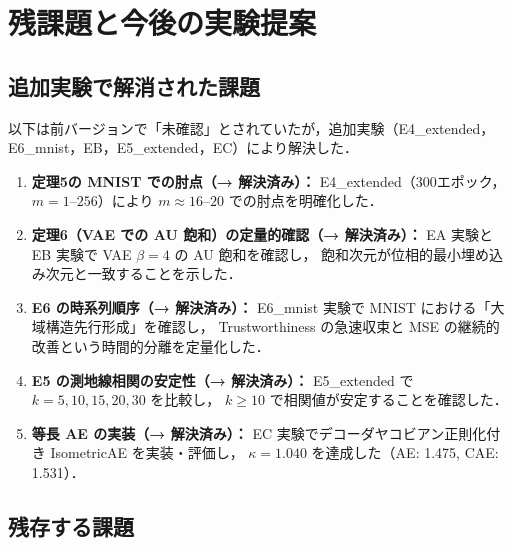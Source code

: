\documentclass[12pt,a4paper]{ltjsarticle}  %
\begin{document}
\section{残課題と今後の実験提案}

\subsection{追加実験で解消された課題}

以下は前バージョンで「未確認」とされていたが，追加実験（E4\_extended，
E6\_mnist，EB，E5\_extended，EC）により解決した．

\begin{enumerate}
  \item \textbf{定理5の MNIST での肘点（→ \textbf{解決済み}）：}
    E4\_extended（300エポック，$m=1\text{--}256$）により
    $m\approx 16\text{--}20$ での肘点を明確化した．
  \item \textbf{定理6（VAE での AU 飽和）の定量的確認（→ \textbf{解決済み}）：}
    EA 実験と EB 実験で VAE $\beta=4$ の AU 飽和を確認し，
    飽和次元が位相的最小埋め込み次元と一致することを示した．
  \item \textbf{E6 の時系列順序（→ \textbf{解決済み}）：}
    E6\_mnist 実験で MNIST における「大域構造先行形成」を確認し，
    Trustworthiness の急速収束と MSE の継続的改善という時間的分離を定量化した．
  \item \textbf{E5 の測地線相関の安定性（→ \textbf{解決済み}）：}
    E5\_extended で $k=5,10,15,20,30$ を比較し，
    $k\geq 10$ で相関値が安定することを確認した．
  \item \textbf{等長 AE の実装（→ \textbf{解決済み}）：}
    EC 実験でデコーダヤコビアン正則化付き IsometricAE を実装・評価し，
    $\kappa=1.040$ を達成した（AE: 1.475, CAE: 1.531）．
\end{enumerate}

\subsection{残存する課題}
\end{document}
